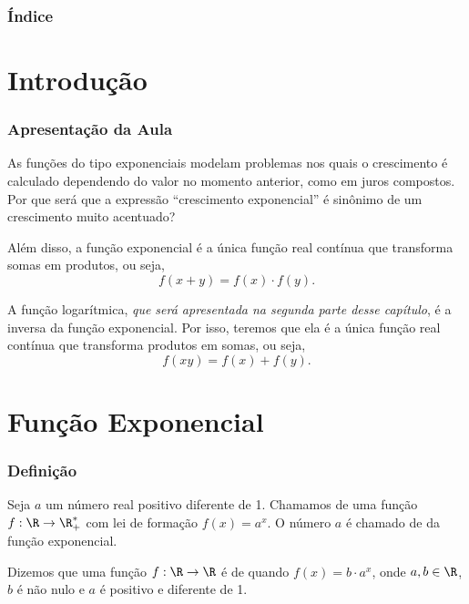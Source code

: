 \documentclass[10pt]{beamer}
\begin{document}
	


	{\backgroundimage\begin{frame}[plain]
		\titlepage
	\end{frame}}



	\begin{frame}
		\frametitle{Índice}
		\tableofcontents
	\end{frame}



\section{Introdução}

\begin{frame}  \frametitle{Apresentação da Aula}

As funções do tipo exponenciais modelam problemas nos quais o crescimento
é calculado dependendo do valor no momento anterior, como em juros
compostos. Por que será que a expressão ``crescimento exponencial''
é sinônimo de um crescimento muito acentuado?

Além disso, a função exponencial é a única função real contínua que
transforma somas em produtos, ou seja, $$f(x+y) = f(x) \cdot f(y).$$

A função logarítmica, \emph{que será apresentada na segunda parte
desse capítulo}, é a inversa da função exponencial. Por isso,
teremos que ela é a única função real contínua que transforma
produtos em somas, ou seja,
$$f(xy) = f(x) + f(y).$$


\end{frame}


\section{Função Exponencial}
\begin{frame} \frametitle{Definição}
\begin{definicao}
Seja $a$ um número real positivo diferente de 1. Chamamos de
 uma função $f: \R \to \R_+^\ast$ com lei de
formação $f(x) =
 a^x$. O número $a$ é chamado de  da função exponencial.
\end{definicao}\pause



\begin{definicao}
Dizemos que uma função $f: \R \to \R$ é de 
quando $f(x) =b\cdot a^x$, onde $a,b \in\R$, $b$ é não nulo e $a$ é
positivo e diferente de 1.
\end{definicao}





\end{frame}
\end{document}
